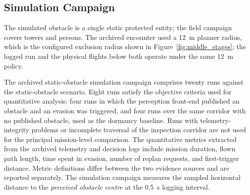 \documentclass[electronics,article,submit,moreauthors]{Definitions/mdpi}
\DeclareRobustCommand{\added}[1]{#1}%
\newcommand{\reviewnote}[1]{}%
\DeclareRobustCommand{\added}[1]{\textcolor{green!50!black}{#1}}
\newcommand{\reviewnote}[1]{\par\noindent\textcolor{red}{[#1]}\par}%
\def\added#1{#1}%
\def\reviewnote#1{}%
\begin{document}
\subsection{Simulation Campaign} 
\reviewnote{TODO LO QUE SEA VUELO REAL NO PONER AQUI EN SIMULACION . REVSIAR LA DISTANCIA MINIMA EN SIMULACION Y EN REALL NO SON LAS DOS 14.2 DEBEN SER DISTINTAS LA SIMULACION 14.9}
\reviewnote{INTRODUCIR ESTO UN POCO QUE ES SIMULATION CAOMPAIGN}
\added{The simulated obstacle is a single static protected entity; the field campaign covers towers and persons.}
\added{The archived encounter used a 12~m planner radius, which is the configured exclusion radius shown in Figure~\ref{fig:middle_stages}; the logged run and the physical flights below both operate under the same 12~m policy.}
\reviewnote{HACE REFERENCIA A FIGURAS QUE NO ESTAN, SON NECESARIAS?}

\added{The archived static-obstacle simulation campaign comprises twenty runs against the static-obstacle scenario. Eight runs satisfy the objective criteria used for quantitative analysis: four runs in which the perception front-end published an obstacle and an evasion was triggered, and four runs over the same corridor with no published obstacle, used as the dormancy baseline. Runs with telemetry-integrity problems or incomplete traversal of the inspection corridor are not used for the principal mission-level comparison. The quantitative metrics extracted from the archived telemetry and decision logs include mission duration, flown path length, time spent in evasion, number of replan requests, and first-trigger distance.}
\added{Metric definitions differ between the two evidence sources and are reported separately. The simulation campaign measures the sampled horizontal distance to the \emph{perceived obstacle centre} at the 0.5~s logging interval.}
\end{document}
